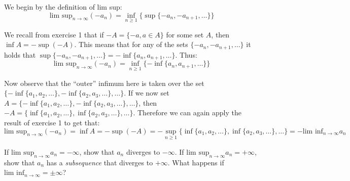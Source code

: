 \begin{solution}

    We begin by the definition of lim sup:
    $$\text{lim sup}_{n \rightarrow \infty} (-a_n) = \inf_{n \geq 1}\{\sup\{-a_n, -a_{n+1}, \ldots\}\}$$

    We recall from exercise 1 that if $-A = \{-a, a \in A\}$ for some set $A$, then $\inf A = -\sup(-A)$. This means that for any of the sets $\{-a_n, -a_{n+1}, \ldots\}$ it holds that $\sup\{-a_n, -a_{n+1}, \ldots\} = -\inf\{a_n, a_{n+1}, \ldots\}$.
    Thus:
    $$\text{lim sup}_{n \rightarrow \infty} (-a_n) = \inf_{n\geq 1}\{-\inf\{a_n, a_{n+1}, \ldots\}\}$$

    Now observe that the ``outer'' infimum here is taken over the set $\{-\inf\{a_1, a_2, \ldots\}, -\inf\{a_2, a_3, \ldots\}, \ldots\}$. If we now set $A = \{-\inf\{a_1, a_2, \ldots\}, -\inf\{a_2, a_3, \ldots\}, \ldots\}$, then $-A = \{\inf\{a_1, a_2, \ldots\}, \inf\{a_2, a_3, \ldots\}, \ldots\}$. Therefore we can again apply the result of exercise 1 to get that:
    $$\text{lim sup}_{n \rightarrow \infty} (-a_n) = \inf A = -\sup(-A) = -\sup_{n\geq1}\{\inf\{a_1, a_2, \ldots\}, \inf\{a_2, a_3, \ldots\}, \ldots\} = - \text{lim inf}_{n \rightarrow \infty} a_n$$
\end{solution}

\begin{exercise}{25}
    If $\text{lim sup}_{n \rightarrow \infty} a_n = -\infty$, show that $a_n$ diverges to $-\infty$. If $\text{lim sup}_{n \rightarrow \infty} a_n = +\infty$, show that $a_n$ has a \textit{subsequence} that diverges to $+\infty$. What happens if $\text{lim inf}_{n \rightarrow \infty} = \pm \infty$?
\end{exercise}

